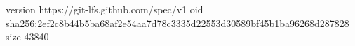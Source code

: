 version https://git-lfs.github.com/spec/v1
oid sha256:2ef2c8b44b5ba68af2e54aa7d78c3335d22553d30589bf45b1ba96268d287828
size 43840
